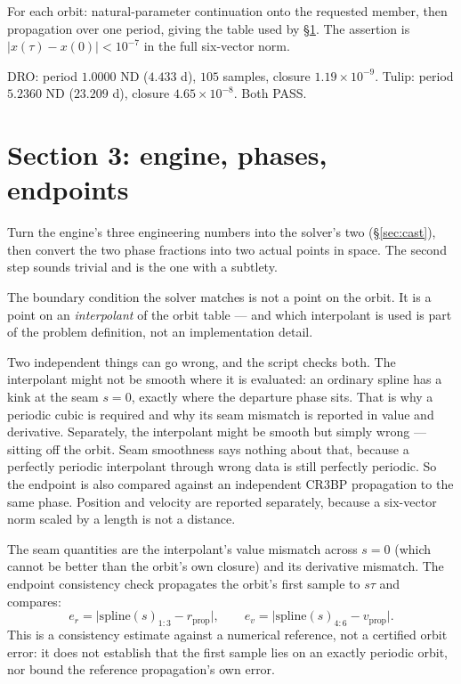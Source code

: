 \documentclass[11pt]{article}
\begin{document}
\begin{rig}
For each orbit: natural-parameter continuation onto the requested member, then
propagation over one period, giving the table used by \S\ref{sec:sec3}. The
assertion is $|x(\tau) - x(0)| < 10^{-7}$ in the full six-vector norm.
\end{rig}

\begin{ran}
DRO: period $1.0000$ ND ($4.433$ d), $105$ samples, closure $1.19\times10^{-9}$.
Tulip: period $5.2360$ ND ($23.209$ d), closure $4.65\times10^{-8}$. Both PASS.
\end{ran}

\section{Section 3: engine, phases, endpoints}\label{sec:sec3}

\begin{eli}
Turn the engine's three engineering numbers into the solver's two
(\S\ref{sec:cast}), then convert the two phase fractions into two actual points
in space. The second step sounds trivial and is the one with a subtlety.
\end{eli}

\begin{intu}
The boundary condition the solver matches is not a point on the orbit. It is a
point on an \emph{interpolant} of the orbit table --- and which interpolant is
used is part of the problem definition, not an implementation detail.

Two independent things can go wrong, and the script checks both. The
interpolant might not be smooth where it is evaluated: an ordinary spline has a
kink at the seam $s = 0$, exactly where the departure phase sits. That is why a
periodic cubic is required and why its seam mismatch is reported in value and
derivative. Separately, the interpolant might be smooth but simply wrong ---
sitting off the orbit. Seam smoothness says nothing about that, because a
perfectly periodic interpolant through wrong data is still perfectly periodic.
So the endpoint is also compared against an independent CR3BP propagation to
the same phase. Position and velocity are reported separately, because a
six-vector norm scaled by a length is not a distance.
\end{intu}

\begin{rig}
The seam quantities are the interpolant's value mismatch across $s = 0$ (which
cannot be better than the orbit's own closure) and its derivative mismatch. The
endpoint consistency check propagates the orbit's first sample to $s\tau$ and
compares:
\[
e_r = \big| \text{spline}(s)_{1:3} - r_{\text{prop}} \big|, \qquad
e_v = \big| \text{spline}(s)_{4:6} - v_{\text{prop}} \big|.
\]
This is a consistency estimate against a numerical reference, not a certified
orbit error: it does not establish that the first sample lies on an exactly
periodic orbit, nor bound the reference propagation's own error.
\end{rig}
\end{document}
